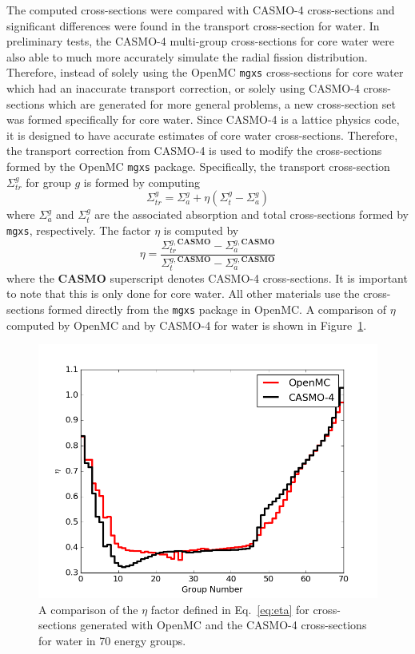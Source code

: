 \clearpage

The computed cross-sections were compared with CASMO-4 cross-sections and significant differences were found in the transport cross-section for water. In preliminary tests, the CASMO-4 multi-group cross-sections for core water were also able to much more accurately simulate the radial fission distribution. Therefore, instead of solely using the OpenMC \texttt{mgxs} cross-sections for core water which had an inaccurate transport correction, or solely using CASMO-4 cross-sections which are generated for more general problems, a new cross-section set was formed specifically for core water. Since CASMO-4 is a lattice physics code, it is designed to have accurate estimates of core water cross-sections. Therefore, the transport correction from CASMO-4 is used to modify the cross-sections formed by the OpenMC \texttt{mgxs} package. Specifically, the transport cross-section $\Sigma_{tr}^g$ for group $g$ is formed by computing
\begin{equation}
\Sigma_{tr}^g = \Sigma_{a}^g + \eta \left( \Sigma_{t}^g - \Sigma_{a}^g \right)
\end{equation}
where $\Sigma_{a}^g$ and $\Sigma_{t}^g$ are the associated absorption and total cross-sections formed by \texttt{mgxs}, respectively. The factor $\eta$ is computed by
\begin{equation}
\eta = \frac{\Sigma_{tr}^{g, \textbf{CASMO}} - \Sigma_{a}^{g, \textbf{CASMO}}}{\Sigma_{t}^{g, \textbf{CASMO}} - \Sigma_{a}^{g, \textbf{CASMO}}}
\label{eq:eta}
\end{equation}
where the \textbf{CASMO} superscript denotes CASMO-4 cross-sections. It is important to note that this is only done for core water. All other materials use the cross-sections formed directly from the \texttt{mgxs} package in OpenMC. A comparison of $\eta$ computed by OpenMC and by CASMO-4 for water is shown in Figure~\ref{fig:eta}.

\begin{figure}[h!]
	\centering
	\includegraphics[width=0.7\linewidth]{figures/beavrs-visual/eta.png}
	\caption{A comparison of the $\eta$ factor defined in Eq.~\ref{eq:eta} for cross-sections generated with OpenMC and the CASMO-4 cross-sections for water in 70 energy groups.}
	\label{fig:eta}
\end{figure} 

